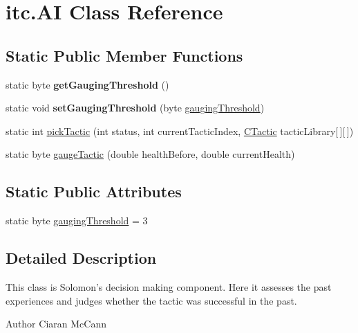 \hypertarget{classitc_1_1_a_i}{
\section{itc.AI Class Reference}
\label{classitc_1_1_a_i}
}
\subsection*{Static Public Member Functions}
\begin{DoxyCompactItemize}
\item 
\hypertarget{classitc_1_1_a_i_a4f6a76cbca96e226d6045caa79180bbb}{
static byte {\bfseries getGaugingThreshold} ()}
\label{classitc_1_1_a_i_a4f6a76cbca96e226d6045caa79180bbb}

\item 
\hypertarget{classitc_1_1_a_i_a7fd6d93d400c4b5887de390dbb8b7117}{
static void {\bfseries setGaugingThreshold} (byte \hyperlink{classitc_1_1_a_i_a55e666c1cfd457046c1b2ddfc2b44d62}{gaugingThreshold})}
\label{classitc_1_1_a_i_a7fd6d93d400c4b5887de390dbb8b7117}

\item 
static int \hyperlink{classitc_1_1_a_i_ad9fb9145c1561f60c2011ad877ea8a0a}{pickTactic} (int status, int currentTacticIndex, \hyperlink{classitc_1_1_c_tactic}{CTactic} tacticLibrary\mbox{[}$\,$\mbox{]}\mbox{[}$\,$\mbox{]})
\item 
static byte \hyperlink{classitc_1_1_a_i_a8cf895fa4d48d6f2c6f17bd49d46ffaa}{gaugeTactic} (double healthBefore, double currentHealth)
\end{DoxyCompactItemize}
\subsection*{Static Public Attributes}
\begin{DoxyCompactItemize}
\item 
static byte \hyperlink{classitc_1_1_a_i_a55e666c1cfd457046c1b2ddfc2b44d62}{gaugingThreshold} = 3
\end{DoxyCompactItemize}


\subsection{Detailed Description}
This class is Solomon's decision making component. Here it assesses the past experiences and judges whether the tactic was successful in the past. \begin{DoxyAuthor}{Author}
Ciaran McCann 
\end{DoxyAuthor}


